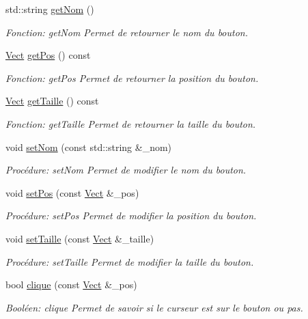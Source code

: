 \begin{DoxyCompactItemize}
std\+::string \hyperlink{classBouton_a84818c161e6ea4ee6d58ccc53d57d802}{get\+Nom} ()
\begin{DoxyCompactList}\small\item\em Fonction\+: get\+Nom Permet de retourner le nom du bouton. \end{DoxyCompactList}\item 
\hyperlink{classVect}{Vect} \hyperlink{classBouton_aed3d0897774100bd880276bd2e73db27}{get\+Pos} () const
\begin{DoxyCompactList}\small\item\em Fonction\+: get\+Pos Permet de retourner la position du bouton. \end{DoxyCompactList}\item 
\hyperlink{classVect}{Vect} \hyperlink{classBouton_ab29ffdc7229d4d702f8dc6498ae08f20}{get\+Taille} () const
\begin{DoxyCompactList}\small\item\em Fonction\+: get\+Taille Permet de retourner la taille du bouton. \end{DoxyCompactList}\item 
void \hyperlink{classBouton_a4bdd74233fa0a3f6fe67d463b75d3f4a}{set\+Nom} (const std\+::string \&\+\_\+nom)
\begin{DoxyCompactList}\small\item\em Procédure\+: set\+Nom Permet de modifier le nom du bouton. \end{DoxyCompactList}\item 
void \hyperlink{classBouton_a393e195ff7d1ff7a5d3c79edc922b0cd}{set\+Pos} (const \hyperlink{classVect}{Vect} \&\+\_\+pos)
\begin{DoxyCompactList}\small\item\em Procédure\+: set\+Pos Permet de modifier la position du bouton. \end{DoxyCompactList}\item 
void \hyperlink{classBouton_a972600e88d0a65431c27bec898fbba36}{set\+Taille} (const \hyperlink{classVect}{Vect} \&\+\_\+taille)
\begin{DoxyCompactList}\small\item\em Procédure\+: set\+Taille Permet de modifier la taille du bouton. \end{DoxyCompactList}\item 
bool \hyperlink{classBouton_a3a5187a073d75fb8afc44704908d5117}{clique} (const \hyperlink{classVect}{Vect} \&\+\_\+pos)
\begin{DoxyCompactList}\small\item\em Booléen\+: clique Permet de savoir si le curseur est sur le bouton ou pas. \end{DoxyCompactList}\end{DoxyCompactItemize}


